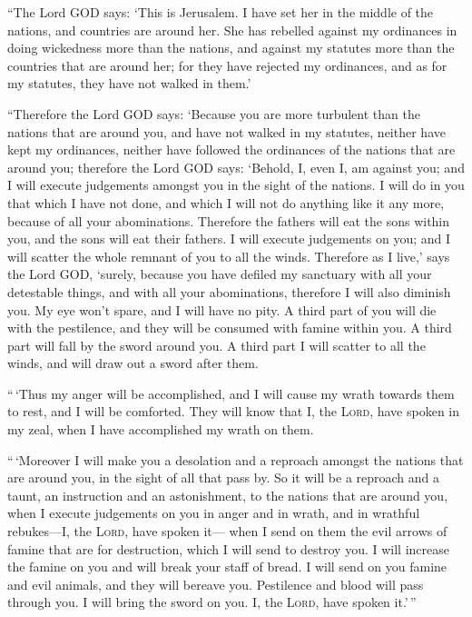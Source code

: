  ``The Lord GOD says: `This is Jerusalem. I have set her
in the middle of the nations, and countries are around her.
 She has rebelled against my ordinances in doing
wickedness more than the nations, and against my statutes more than the
countries that are around her; for they have rejected my ordinances, and
as for my statutes, they have not walked in them.'

 ``Therefore the Lord GOD says: `Because you are more
turbulent than the nations that are around you, and have not walked in
my statutes, neither have kept my ordinances, neither have followed the
ordinances of the nations that are around you;  therefore
the Lord GOD says: `Behold, I, even I, am against you; and I will
execute judgements amongst you in the sight of the nations.
 I will do in you that which I have not done, and which I
will not do anything like it any more, because of all your abominations.
 Therefore the fathers will eat the sons within you, and
the sons will eat their fathers. I will execute judgements on you; and I
will scatter the whole remnant of you to all the winds. 
Therefore as I live,' says the Lord GOD, `surely, because you have
defiled my sanctuary with all your detestable things, and with all your
abominations, therefore I will also diminish you. My eye won't spare,
and I will have no pity.  A third part of you will die
with the pestilence, and they will be consumed with famine within you. A
third part will fall by the sword around you. A third part I will
scatter to all the winds, and will draw out a sword after them.

 ``\,`Thus my anger will be accomplished, and I will
cause my wrath towards them to rest, and I will be comforted. They will
know that I, the \textsc{Lord}, have spoken in my zeal, when I have
accomplished my wrath on them.

 ``\,`Moreover I will make you a desolation and a
reproach amongst the nations that are around you, in the sight of all
that pass by.  So it will be a reproach and a taunt, an
instruction and an astonishment, to the nations that are around you,
when I execute judgements on you in anger and in wrath, and in wrathful
rebukes---I, the \textsc{Lord}, have spoken it---  when I
send on them the evil arrows of famine that are for destruction, which I
will send to destroy you. I will increase the famine on you and will
break your staff of bread.  I will send on you famine and
evil animals, and they will bereave you. Pestilence and blood will pass
through you. I will bring the sword on you. I, the \textsc{Lord}, have
spoken it.'\,''

